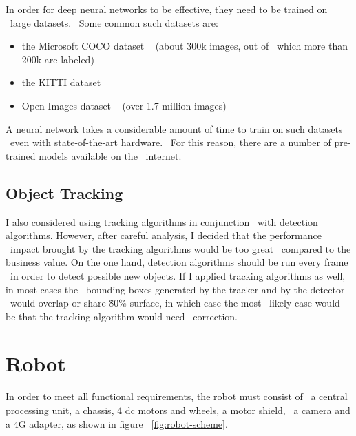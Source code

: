 In order for deep neural networks to be effective, they need to be trained on \
large datasets. \
Some common such datasets are:
\begin{itemize}
    \item the Microsoft COCO dataset ~\cite{COCO} (about 300k images, out of \
            which more than 200k are labeled)
    \item the KITTI dataset ~\cite{kitti}
    \item Open Images dataset ~\cite{openimages} (over 1.7 million images)
\end{itemize}

A neural network takes a considerable amount of time to train on such datasets \
even with state-of-the-art hardware. \
For this reason, there are a number of pre-trained models available on the \
internet.

\subsection{Object Tracking}
\label{subsec:analysis-object-tracking}
I also considered using tracking algorithms in conjunction \
with detection algorithms.
However, after careful analysis, I decided that the performance \
impact brought by the tracking algorithms would be too great \
compared to the business value.
On the one hand, detection algorithms should be run every frame \
in order to detect possible new objects.
If I applied tracking algorithms as well, in most cases the \
bounding boxes generated by the tracker and by the detector \
would overlap or share \~80\% surface, in which case the most \
likely case would be that the tracking algorithm would need \
correction.


\section{Robot}
\label{sec:analysis-robot-control}
In order to meet all functional requirements, the robot must consist of \
a central processing unit, a chassis, 4 dc motors and wheels, a motor shield, \
a camera and a 4G adapter, as shown in figure ~\ref{fig:robot-scheme}.


